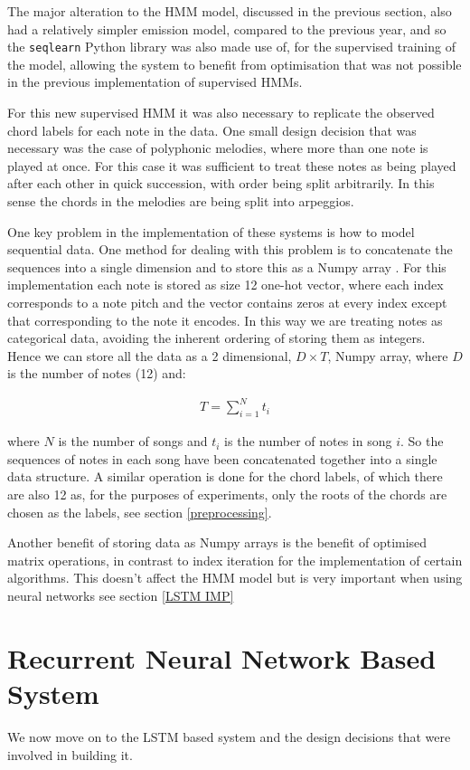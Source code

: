 \documentclass[bsc,singlespacing,logo, parskip, deptreport]{infthesis}
\begin{document}
The major alteration to the HMM model, discussed in the previous section, also had a relatively simpler emission model, compared to the previous year, and so the {\tt seqlearn} Python library \cite{buitinck} was also made use of, for the supervised training of the model, allowing the system to benefit from optimisation that was not possible in the previous implementation of supervised HMMs.

For this new supervised HMM it was also necessary to replicate the observed chord labels for each note in the data. One small design decision that was necessary was the case of polyphonic melodies, where more than one note is played at once. For this case it was sufficient to treat these notes as being played after each other in quick succession, with order being split arbitrarily. In this sense the chords in the melodies are being split into arpeggios.

One key problem in the implementation of these systems is how to model sequential data. One method for dealing with this problem is to concatenate the sequences into a single dimension and to store this as a Numpy array \cite{numpy_2005}. For this implementation each note is stored as size 12 one-hot vector, where each index corresponds to a note pitch and the vector contains zeros at every index except that corresponding to the note it encodes. In this way we are treating notes as categorical data, avoiding the inherent ordering of storing them as integers. Hence we can store all the data as a 2 dimensional, $D \times T$, Numpy array, where $D$ is the number of notes (12) and:

\begin{align}
  T = \sum_{i=1}^{N} t_i
\end{align}

where $N$ is the number of songs and $t_i$ is the number of notes in song $i$. So the sequences of notes in each song have been concatenated together into a single data structure. A similar operation is done for the chord labels, of which there are also 12 as, for the purposes of experiments, only the roots of the chords are chosen as the labels, see section \ref{preprocessing}.

Another benefit of storing data as Numpy arrays is the benefit of optimised matrix operations, in contrast to index iteration for the implementation of certain algorithms. This doesn't affect the HMM model but is very important when using neural networks see section \ref{LSTM IMP}

\section{Recurrent Neural Network Based System} \label{LSTM}
We now move on to the LSTM based system and the design decisions that were involved in building it. 
\end{document}
